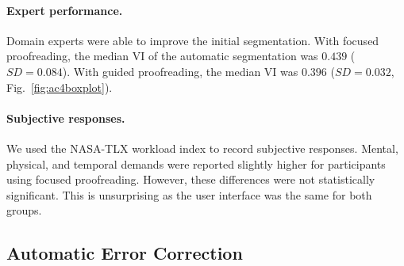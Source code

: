 \begin{table}[t]
\caption{Average proofreading speed for novice users of Dojo, Focused Proofreading (FP) and our Guided Proofreading (GP). Our system achieves significantly higher VI reduction per minute (7.5$\times$) over state-of-the-art FP, while being slightly slower per correction.}%
\label{tab:correctiontimes}
\end{table}

\paragraph{Expert performance.} Domain experts were able to improve the initial segmentation. With focused proofreading, the median VI of the automatic segmentation was $0.439$ ($SD=0.084$). With guided proofreading, the median VI was $0.396$ ($SD=0.032$, Fig.~\ref{fig:ac4boxplot}).

\paragraph{Subjective responses.} We used the NASA-TLX workload index to record subjective responses. Mental, physical, and temporal demands were reported slightly higher for participants using focused proofreading. However, these differences were not statistically significant. This is unsurprising as the user interface was the same for both groups.


\subsection{Automatic Error Correction}

